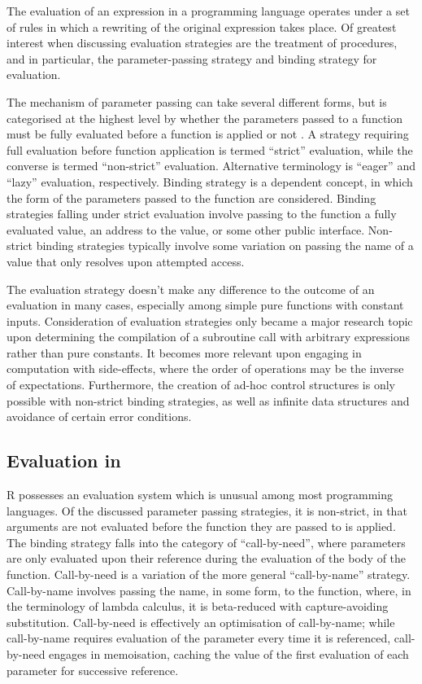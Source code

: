 The evaluation of an expression in a programming language operates under a set of rules in which a rewriting of the original expression takes place.
Of greatest interest when discussing evaluation strategies are the treatment of procedures, and in particular, the parameter-passing strategy and binding strategy for evaluation.

The mechanism of parameter passing can take several different forms, but is categorised at the highest level by whether the parameters passed to a function must be fully evaluated before a function is applied or not \cite{crank1991param}.
A strategy requiring full evaluation before function application is termed ``strict'' evaluation, while the converse is termed ``non-strict'' evaluation.
Alternative terminology is ``eager'' and ``lazy'' evaluation, respectively\cite{henderson1976lazy}.
Binding strategy is a dependent concept, in which the form of the parameters passed to the function are considered\cite{abelson1996sicp:order}.
Binding strategies falling under strict evaluation involve passing to the function a fully evaluated value, an address to the value, or some other public interface.
Non-strict binding strategies typically involve some variation on passing the name of a value that only resolves upon attempted access.

The evaluation strategy doesn't make any difference to the outcome of an evaluation in many cases, especially among simple pure functions with constant inputs.
Consideration of evaluation strategies only became a major research topic upon determining the compilation of a subroutine call with arbitrary expressions rather than pure constants.
It becomes more relevant upon engaging in computation with side-effects, where the order of operations may be the inverse of expectations.
Furthermore, the creation of ad-hoc control structures is only possible with non-strict binding strategies, as well as infinite data structures and avoidance of certain error conditions\cite{okasaki1998functional}.

\subsection{Evaluation in \R}\label{sec:evalinr}

R possesses an evaluation system which is unusual among most programming languages.
Of the discussed parameter passing strategies, it is non-strict, in that arguments are not evaluated before the function they are passed to is applied\cite{rcore2020ints:argeval}.
The binding strategy falls into the category of ``call-by-need'', where parameters are only evaluated upon their reference during the evaluation of the body of the function\cite{ariola1995callbyneed}.
Call-by-need is a variation of the more general ``call-by-name'' strategy.
Call-by-name involves passing the name, in some form, to the function, where, in the terminology of lambda calculus, it is beta-reduced with capture-avoiding substitution\cite{fischer1972lambda}.
Call-by-need is effectively an optimisation of call-by-name; while call-by-name requires evaluation of the parameter every time it is referenced, call-by-need engages in memoisation, caching the value of the first evaluation of each parameter for successive reference.

